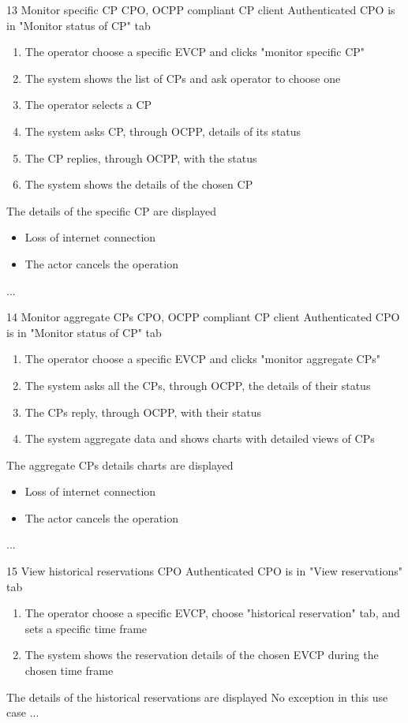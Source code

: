 \usecase
{13}
{Monitor specific CP} %
{CPO, OCPP compliant CP client} %
{Authenticated CPO is in "Monitor status of CP" tab} %
{ %
    \begin{enumerate}
        \item The operator choose a specific EVCP and clicks "monitor specific CP"
        \item The system shows the list of CPs and ask operator to choose one
        \item The operator selects a CP
        \item The system asks CP, through OCPP, details of its status
        \item The CP replies, through OCPP, with the status
        \item The system shows the details of the chosen CP
    \end{enumerate}
}
{The details of the specific CP are displayed} %
{ %
    \begin{itemize}
        \item Loss of internet connection
        \item The actor cancels the operation
    \end{itemize}
}
{ %
    ...
}

\usecase
{14}
{Monitor aggregate CPs} %
{CPO, OCPP compliant CP client} %
{Authenticated CPO is in "Monitor status of CP" tab} %
{ %
    \begin{enumerate}
        \item The operator choose a specific EVCP and clicks "monitor aggregate CPs"
        \item The system asks all the CPs, through OCPP, the details of their status
        \item The CPs reply, through OCPP, with their status
        \item The system aggregate data and shows charts with detailed views of CPs
    \end{enumerate}
}
{The aggregate CPs details charts are displayed} %
{ %
    \begin{itemize}
        \item Loss of internet connection
        \item The actor cancels the operation
    \end{itemize}
}
{ %
    ...
}

\usecase
{15}
{View historical reservations} %
{CPO} %
{Authenticated CPO is in "View reservations" tab} %
{ %
    \begin{enumerate}
        \item The operator choose a specific EVCP, choose "historical reservation" tab, and sets a specific time frame
        \item The system shows the reservation details of the chosen EVCP during the chosen time frame
    \end{enumerate}
}
{The details of the historical reservations are displayed} %
{ %
    No exception in this use case
}
{ %
    ...
}

